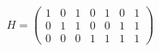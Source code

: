 \documentclass[preview]{standalone}
\begin{document}
\begin{align*}
H = \begin{pmatrix}1 & 0 & 1 & 0 & 1 & 0 & 1 \\0 & 1 & 1 & 0 & 0 & 1 & 1 \\0 & 0 & 0 & 1 & 1 & 1 & 1\end{pmatrix}
\end{align*}
\end{document}
